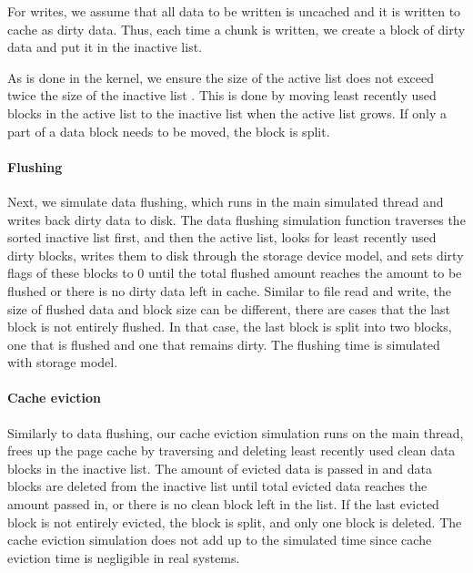 \documentclass[conference]{IEEEtran}
\begin{document}
			For writes, we assume that all data to be written is 
			uncached and it is written to cache as dirty data. 
			Thus, each time a chunk is written, we create a block of dirty data 
			and put it in the inactive list.		
			
            As is done in the kernel, we ensure the size of the active list does not 
            exceed twice the size of the inactive list 
			\cite{gorman2004understanding, linuxdev3rd2010}. 
			This is done by moving least recently used blocks in the active list 
			to the inactive list when the active list grows. If only a part of a data 
			block needs to be moved, the block is split.

			\paragraph*{Flushing}
			Next, we simulate data flushing, which runs in the main simulated 
			thread and writes back dirty data to disk. 
			The data flushing simulation function traverses the sorted 
			inactive list first, and then the active list, looks for least recently used 
			dirty blocks, writes them to disk through the storage device model, 
			and sets dirty flags of these blocks to 0 until the total flushed amount 
			reaches the amount to be flushed or there is no dirty data left in cache. 
			Similar to file read and write, the size of flushed data and block size 
			can be different, there are cases that the last block is not entirely flushed.  
			In that case, the last block is split into two blocks, one that is flushed 
			and one that remains dirty.
			The flushing time is simulated with storage model.
			
			\paragraph*{Cache eviction}	
			Similarly to data flushing, our cache eviction simulation runs on 
			the main thread, frees up the page cache by traversing and deleting 
			least recently used clean data blocks in the inactive list.
			The amount of evicted data is passed in and data blocks are deleted 
			from the inactive list until total evicted data reaches the amount 
			passed in, or there is no clean block left in the list.
			If the last evicted block is not entirely evicted, the block is split, 
			and only one block is deleted.
			The cache eviction simulation does not add up to the simulated time 
			since cache eviction time is negligible in real systems.		
			
\end{document}
